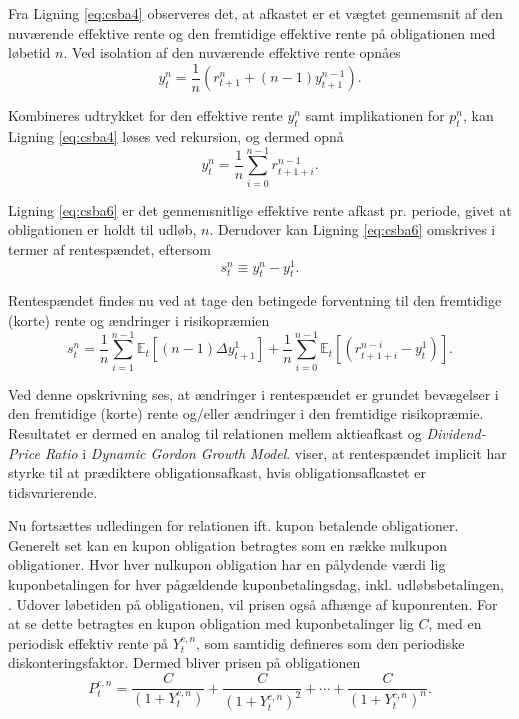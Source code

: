 \documentclass[
  a4paper,
  oneside]{memoir}
\begin{document}
Fra Ligning \eqref{eq:csba4} observeres det, at afkastet er et vægtet gennemsnit af den nuværende effektive rente og den fremtidige effektive rente på obligationen med løbetid \(n\). Ved isolation af den nuværende effektive rente opnåes
\begin{equation}
y_t^n = \frac{1}{n} (r_{t+1}^n + (n-1) y_{t+1}^{n-1}). \label{eq:csba5}
\end{equation}

Kombineres udtrykket for den effektive rente \(y_t^n\) samt implikationen for \(p_t^n\), kan Ligning \eqref{eq:csba4} løses ved rekursion, og dermed opnå
\begin{equation}
y_t^n = \frac{1}{n} \sum_{i=0}^{n-1} r_{t+1+i}^{n-1}. \label{eq:csba6}
\end{equation}

Ligning \eqref{eq:csba6} er det gennemsnitlige effektive rente afkast pr. periode, givet at obligationen er holdt til udløb, \(n\). Derudover kan Ligning \eqref{eq:csba6} omskrives i termer af rentespændet, eftersom
\begin{equation}
s_t^n\equiv y_t^n - y_t^1. \label{eq:csba7}
\end{equation}

Rentespændet findes nu ved at tage den betingede forventning til den fremtidige (korte) rente og ændringer i risikopræmien
\begin{equation}
s_t^n=\frac{1}{n} \sum_{i=1}^{n-1} \mathbb{E}_t[(n-1)\Delta y_{t+1}^1] + \frac{1}{n}\sum_{i=0}^{n-1}\mathbb{E}_t[(r_{t+1+i}^{n-i}-y_t^1)]. \label{eq:csba8}
\end{equation}

Ved denne opskrivning ses, at ændringer i rentespændet er grundet bevægelser i den fremtidige (korte) rente og/eller ændringer i den fremtidige risikopræmie. Resultatet er dermed en analog til relationen mellem aktieafkast og \emph{Dividend-Price Ratio} i \emph{Dynamic Gordon Growth Model}. \citep{Fama1987} viser, at rentespændet implicit har styrke til at prædiktere obligationsafkast, hvis obligationsafkastet er tidsvarierende.

Nu fortsættes udledingen for relationen ift. kupon betalende obligationer. Generelt set kan en kupon obligation betragtes som en række nulkupon obligationer. Hvor hver nulkupon obligation har en pålydende værdi lig kuponbetalingen for hver pågældende kuponbetalingsdag, inkl. udløbsbetalingen, \citep{Campbell1997}. Udover løbetiden på obligationen, vil prisen også afhænge af kuponrenten. For at se dette betragtes en kupon obligation med kuponbetalinger lig \(C\), med en periodisk effektiv rente på \(Y_t^{c,n}\), som samtidig defineres som den periodiske diskonteringsfaktor. Dermed bliver prisen på obligationen
\begin{equation}
P_t^{c,n}=\frac{C}{(1+Y_t^{c,n})}+\frac{C}{(1+Y_t^{c,n})^2}+\cdots+\frac{C}{(1+Y_t^{c,n})^n}.  \label{eq:csba9}
\end{equation}
\end{document}
